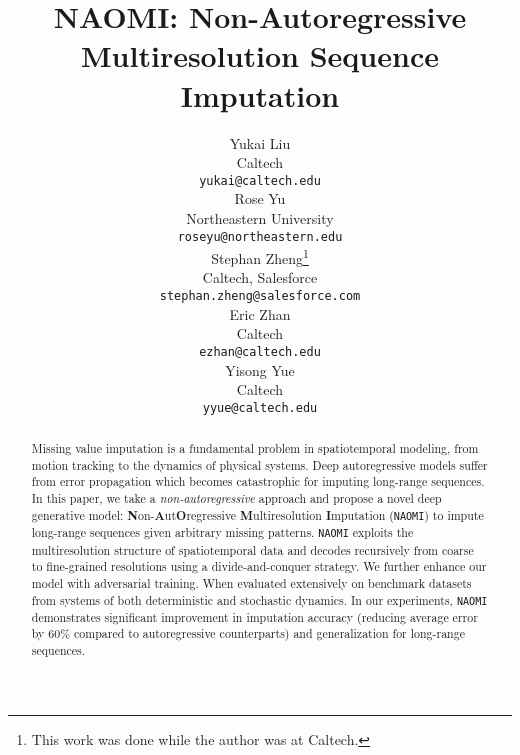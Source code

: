 \documentclass{article}
\title{NAOMI: Non-Autoregressive Multiresolution Sequence Imputation}
\author{Yukai Liu \\
  Caltech \\
  \texttt{yukai@caltech.edu} \\
  \And
  Rose Yu \\
  Northeastern University \\
  \texttt{roseyu@northeastern.edu} \\
  \And
  Stephan Zheng\thanks{This work was done while the author was at Caltech.} \\
  Caltech, Salesforce \\
  \texttt{stephan.zheng@salesforce.com} \\
  \And
  Eric Zhan \\
  Caltech \\
  \texttt{ezhan@caltech.edu} \\
  \And
  Yisong Yue \\
  Caltech \\
  \texttt{yyue@caltech.edu}
}
\newcommand{\ours}{\texttt{NAOMI}}
\begin{document}
\maketitle

\begin{abstract}
Missing value imputation is a fundamental problem in  spatiotemporal modeling, from motion tracking to the dynamics of physical systems.
Deep autoregressive models suffer from  error propagation which becomes catastrophic for imputing long-range sequences. 
In this paper, we take a \textit{non-autoregressive} approach and propose a novel deep generative model: \textbf{N}on-\textbf{A}ut\textbf{O}regressive \textbf{M}ultiresolution \textbf{I}mputation (\ours{}) to impute long-range sequences given arbitrary missing patterns.
\ours{} exploits the multiresolution structure of spatiotemporal data and decodes recursively from coarse to fine-grained resolutions using a divide-and-conquer strategy.
We further enhance our model with adversarial training.
When evaluated extensively on  benchmark  datasets from systems of both deterministic and stochastic dynamics. In our experiments, \ours{} demonstrates significant improvement in imputation accuracy (reducing average error by 60\% compared to autoregressive counterparts) and generalization  for long-range sequences.
\end{abstract}










\end{document}
